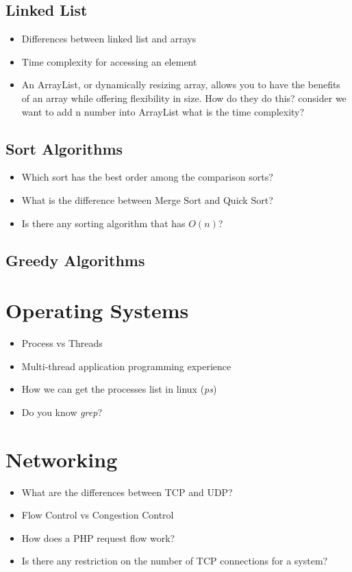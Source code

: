 \documentclass[]{book}
\begin{document}
\subsection{Linked List}

\begin{itemize}
  \item Differences between linked list and arrays
  \item Time complexity for accessing an element
  \item An ArrayList, or dynamically resizing array, allows you to have the benefits of an array while offering flexibility in size.
    How do they do this? consider we want to add n number into ArrayList what is the time complexity?
\end{itemize}

\subsection{Sort Algorithms}

\begin{itemize}
  \item Which sort has the best order among the comparison sorts?
  \item What is the difference between Merge Sort and Quick Sort?
  \item Is there any sorting algorithm that has $O(n)$?
\end{itemize}

\subsection{Greedy Algorithms}

\section{Operating Systems}
\begin{itemize}
  \item Process vs Threads
  \item Multi-thread application programming experience
  \item How we can get the processes list in linux (\textit{ps})
  \item Do you know \textit{grep}?
\end{itemize}

\section{Networking}
\begin{itemize}
  \item What are the differences between TCP and UDP\@?
  \item Flow Control vs Congestion Control
  \item How does a PHP request flow work?
  \item Is there any restriction on the number of TCP connections for a system?
\end{itemize}
\end{document}
